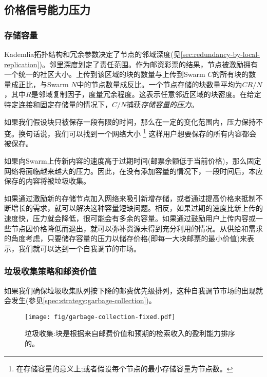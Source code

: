 \subsection{价格信号能力压力}\label{sec:capacity-pressure}

\yellow{}

\subsubsection{存储容量}
Kademlia拓扑结构和冗余参数决定了节点的邻域深度(见\ref{sec:redundancy-by-local-replication})。邻里深度划定了责任范围。作为邮资彩票的结果，节点被激励拥有一个统一的社区大小。上传到该区域的块的数量与上传到Swarm $C$的所有块的数量成正比，与Swarm $N$中的节点数量成反比。一个节点存储的块数量平均为$CR/N$，其中$R$是邻域复制因子，度量冗余程度。这表示任意邻近区域的块密度。在给定特定连接和固定存储量的情况下，$C/N$捕获\emph{存储容量的压力}。

如果我们假设块只被保存一段有限的时间，那么在一定的变化范围内，压力保持不变。换句话说，我们可以找到一个网络大小%
%
\footnote{在存储容量的意义上;或者假设每个节点的最小存储容量为节点数。}
%
这样用户想要保存的所有内容都会被保存。 

如果向Swarm上传新内容的速度高于过期时间(邮票余额低于当前价格)，那么固定网络将面临越来越大的压力。因此，在没有添加容量的情况下，一段时间后，本应保存的内容将被垃圾收集。 

如果通过激励新的存储节点加入网络来吸引新增存储，或者通过提高价格来抵制不断增长的需求，就可以解决这种容量短缺问题。相反，如果过期的速度比新上传的速度快，压力就会降低，很可能会有多余的容量。如果通过鼓励用户上传内容或一些节点因价格降低而退出，就可以弥补资源未得到充分利用的情况。从供给和需求的角度考虑，只要储存容量的压力以储存价格(即每一大块邮票的最小价值)来表示，我们就可以达到一个自我调节的市场。 

\subsubsection{垃圾收集策略和邮资价值}

如果我们确保垃圾收集队列按下降的邮费优先级排列，这种自我调节市场的出现就会发生(参见\ref{spec:strategy:garbage-collection})。

\begin{figure}[htbp]
  \centering
  \texttt{[image: fig/garbage-collection-fixed.pdf]}
  \caption[垃圾收集\statusgreen]{垃圾收集:块是根据来自邮费价值和预期的检索收入的盈利能力排序的。}
  \label{fig:garbage-collection}
\end{figure}


